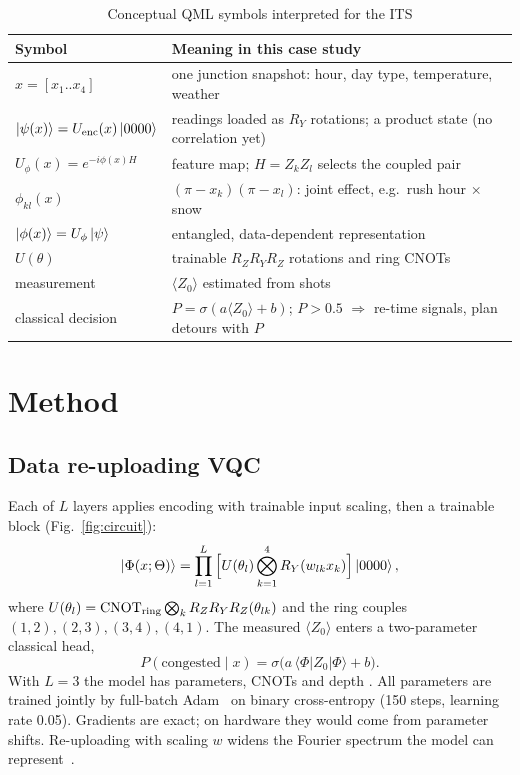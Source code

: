 \documentclass[conference]{IEEEtran}
\begin{document}
\begin{table}[t]
\caption{Conceptual QML symbols interpreted for the ITS}
\label{tab:symbols}
\centering
\footnotesize
\begin{tabular}{@{}p{2.25cm}p{5.85cm}@{}}
\toprule
Symbol & Meaning in this case study \\
\midrule
$x=[x_1..x_4]$ & one junction snapshot: hour, day type, temperature, weather \\
$\ket{\psi(x)}=U_{\rm enc}(x)\ket{0000}$ & readings loaded as $R_Y$ rotations; a product state (no correlation yet) \\
$U_\phi(x)=e^{-i\phi(x)H}$ & feature map; $H=Z_kZ_l$ selects the coupled pair \\
$\phi_{kl}(x)$ & $(\pi-x_k)(\pi-x_l)$: joint effect, e.g.\ rush hour $\times$ snow \\
$\ket{\phi(x)}=U_\phi\ket{\psi}$ & entangled, data-dependent representation \\
$U(\theta)$ & trainable $R_ZR_YR_Z$ rotations and ring CNOTs \\
measurement & $\langle Z_0\rangle$ estimated from shots \\
classical decision & $P=\sigma(a\langle Z_0\rangle+b)$; $P>0.5$ $\Rightarrow$ re-time signals, plan detours with $P$ \\
\bottomrule
\end{tabular}
\end{table}

\section{Method}
\subsection{Data re-uploading VQC}
Each of $L$ layers applies encoding with trainable input scaling, then a trainable block (Fig.~\ref{fig:circuit}):
\begin{equation}
\ket{\Phi(x;\Theta)}=\prod_{l=1}^{L}\Big[U(\theta_l)\bigotimes_{k=1}^{4}R_Y(w_{lk}x_k)\Big]\ket{0000},
\end{equation}
where $U(\theta_l)=\mathrm{CNOT}_{\rm ring}\bigotimes_k R_Z R_Y R_Z(\theta_{lk})$ and the ring couples $(1,2),(2,3),(3,4),(4,1)$. The measured $\langle Z_0\rangle$ enters a two-parameter classical head,
\begin{equation}
P(\text{congested}\mid x)=\sigma\big(a\,\langle\Phi|Z_0|\Phi\rangle+b\big).
\end{equation}
With $L{=}3$ the model has \nparams{} parameters, \ncx{} CNOTs and depth \depth{}. All parameters are trained jointly by full-batch Adam~\cite{kingma2015adam} on binary cross-entropy (150 steps, learning rate 0.05). Gradients are exact; on hardware they would come from parameter shifts. Re-uploading with scaling $w$ widens the Fourier spectrum the model can represent~\cite{schuld2021effect}.
\end{document}
